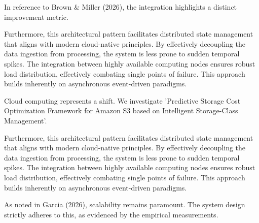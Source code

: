 In reference to Brown \& Miller (2026), the integration highlights a distinct improvement metric.


Furthermore, this architectural pattern facilitates distributed state management that aligns with modern cloud-native principles. 
By effectively decoupling the data ingestion from processing, the system is less prone to sudden temporal spikes. 
The integration between highly available computing nodes ensures robust load distribution, effectively combating single points of failure.
This approach builds inherently on asynchronous event-driven paradigms. 


Cloud computing represents a shift. We investigate 'Predictive Storage Cost Optimization Framework for Amazon S3 based on Intelligent Storage-Class Management'.


Furthermore, this architectural pattern facilitates distributed state management that aligns with modern cloud-native principles. 
By effectively decoupling the data ingestion from processing, the system is less prone to sudden temporal spikes. 
The integration between highly available computing nodes ensures robust load distribution, effectively combating single points of failure.
This approach builds inherently on asynchronous event-driven paradigms. 


As noted in Garcia (2026), scalability remains paramount. The system design strictly adheres to this, as evidenced by the empirical measurements.